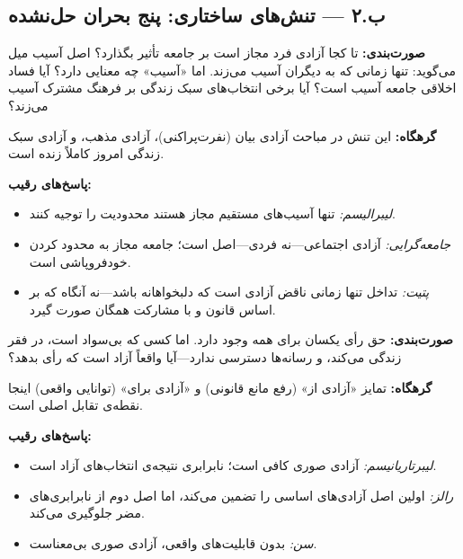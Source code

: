 \subsection{ب.۲ — تنش‌های ساختاری: پنج بحران حل‌نشده}
\label{subsec:tensions}

\begin{tcolorbox}[enemybox, title={تنش ساختاری اول: آزادی فردی در برابر آزادی جمعی}]

\textbf{صورت‌بندی:} تا کجا آزادی فرد مجاز است بر جامعه تأثیر بگذارد؟ اصل آسیب میل می‌گوید: تنها زمانی که به دیگران آسیب می‌زند. اما «آسیب» چه معنایی دارد؟ آیا فساد اخلاقی جامعه آسیب است؟ آیا برخی انتخاب‌های سبک زندگی بر فرهنگ مشترک آسیب می‌زند؟

\textbf{گرهگاه:} این تنش در مباحث آزادی بیان (نفرت‌پراکنی)، آزادی مذهب، و آزادی سبک زندگی امروز کاملاً زنده است.

\textbf{پاسخ‌های رقیب:}
\begin{itemize}[leftmargin=2em]
  \item \textit{لیبرالیسم:} تنها آسیب‌های مستقیم مجاز هستند محدودیت را توجیه کنند.
  \item \textit{جامعه‌گرایی:} آزادی اجتماعی—نه فردی—اصل است؛ جامعه مجاز به محدود کردن خودفروپاشی است.
  \item \textit{پتیت:} تداخل تنها زمانی ناقض آزادی است که دلبخواهانه باشد—نه آنگاه که بر اساس قانون و با مشارکت همگان صورت گیرد.
\end{itemize}
\end{tcolorbox}

\begin{tcolorbox}[enemybox, title={تنش ساختاری دوم: آزادی صوری در برابر آزادی واقعی}]

\textbf{صورت‌بندی:} حق رأی یکسان برای همه وجود دارد. اما کسی که بی‌سواد است، در فقر زندگی می‌کند، و رسانه‌ها دسترسی ندارد—آیا واقعاً آزاد است که رأی بدهد؟

\textbf{گرهگاه:} تمایز «آزادی از» (رفع مانع قانونی) و «آزادی برای» (توانایی واقعی) اینجا نقطه‌ی تقابل اصلی است.

\textbf{پاسخ‌های رقیب:}
\begin{itemize}[leftmargin=2em]
  \item \textit{لیبرتاریانیسم:} آزادی صوری کافی است؛ نابرابری نتیجه‌ی انتخاب‌های آزاد است.
  \item \textit{رالز:} اولین اصل آزادی‌های اساسی را تضمین می‌کند، اما اصل دوم از نابرابری‌های مضر جلوگیری می‌کند.
  \item \textit{سن:} بدون قابلیت‌های واقعی، آزادی صوری بی‌معناست.
\end{itemize}
\end{tcolorbox}

